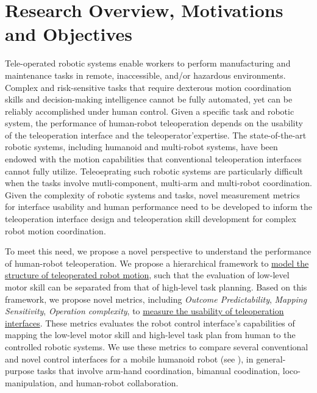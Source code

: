\section{Research Overview, Motivations and Objectives}\label{sec:intro}

Tele-operated robotic systems enable workers to perform manufacturing and maintenance tasks in remote, inaccessible, and/or hazardous environments. Complex and risk-sensitive tasks that require dexterous motion coordination skills and decision-making intelligence cannot be fully automated, yet can be reliably accomplished under human control. Given a specific task and robotic system, the performance of human-robot teleoperation depends on the usability of the teleoperation interface and the teleoperator'expertise. The state-of-the-art robotic systems, including humanoid and multi-robot systems, have been endowed with the motion capabilities that conventional teleoperation interfaces cannot fully utilize. Teleoeprating such robotic systems are particularly difficult when the tasks involve mutli-component, multi-arm and multi-robot coordination. Given the complexity of robotic systems and tasks, novel measurement metrics for interface usability and human performance need to be developed to inform the teleoperation interface design and teleoperation skill development for complex robot motion coordination. 



To meet this need, we propose a novel perspective to understand the performance of human-robot teleoperation. We propose a hierarchical framework to \underline{model the structure of teleoperated robot motion}, such that the evaluation of low-level motor skill can be separated from that of high-level task planning. Based on this framework, we propose novel metrics, including \textit{Outcome Predictability}, \textit{Mapping Sensitivity}, \textit{Operation complexity}, to \underline{measure the usability of teleoperation interfaces}. These metrics evaluates the robot control interface's capabilities of mapping the low-level motor skill and high-level task plan from human to the controlled robotic systems. We use these metrics to compare several conventional and novel control interfaces for a mobile humanoid robot (see ), in general-purpose tasks that involve arm-hand coordination, bimanual coodination, loco-manipulation, and human-robot collaboration. 

